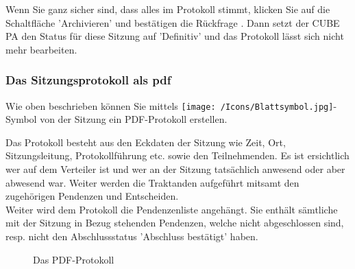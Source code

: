 Wenn Sie ganz sicher sind, dass alles im Protokoll stimmt, klicken Sie auf die Schaltfläche 'Archivieren'  und bestätigen die Rückfrage . Dann setzt der CUBE PA den Status für diese Sitzung auf 'Definitiv' und das Protokoll lässt sich nicht mehr bearbeiten.

\subsubsection{Das Sitzungsprotokoll als pdf}
\label{bkm:Ref2018071801}

Wie oben beschrieben können Sie mittels \texttt{[image: /Icons/Blattsymbol.jpg]}-Symbol  von der Sitzung ein PDF-Protokoll erstellen.

\vspace{\baselineskip}

Das Protokoll besteht aus den Eckdaten der Sitzung wie Zeit, Ort, Sitzungsleitung, Protokollführung etc. sowie den Teilnehmenden. Es ist ersichtlich wer auf dem Verteiler ist und wer an der Sitzung tatsächlich anwesend oder aber abwesend war. Weiter werden die Traktanden aufgeführt mitsamt den zugehörigen Pendenzen und Entscheiden. \\
Weiter wird dem Protokoll die Pendenzenliste angehängt. Sie enthält sämtliche mit der Sitzung in Bezug stehenden Pendenzen, welche nicht abgeschlossen sind, resp. nicht den Abschlussstatus 'Abschluss bestätigt' haben.

\begin{figure}[H]
\caption{Das PDF-Protokoll}
\end{figure}

